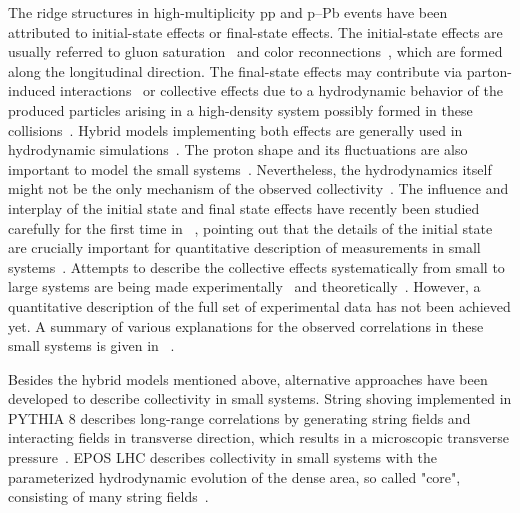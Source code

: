 The ridge structures in high-multiplicity pp and p--Pb events have been attributed to initial-state effects or final-state effects. The initial-state effects are usually referred to gluon saturation~\cite{Dusling:2012cg,Bzdak:2013zma} and color reconnections~\cite{Ortiz:2013yxa,Sarma:2019teo}, which are formed along the longitudinal direction. The final-state effects may contribute via parton-induced interactions~\cite{Arbuzov:2011yr} or collective effects due to a hydrodynamic behavior of the produced particles arising in a high-density system possibly formed in these collisions~\cite{Weller:2017tsr,Zhao:2017rgg}. 
Hybrid models implementing both effects are generally used in hydrodynamic simulations~\cite{Greif:2017bnr,Mantysaari:2017cni}. 
The proton shape and its fluctuations are also important to model the small systems~\cite{Mantysaari:2017cni}.
Nevertheless, the hydrodynamics itself might not be the only mechanism of the observed collectivity~\cite{Zhao:2020pty}. 
The influence and interplay of the initial state and final state effects have recently been studied carefully for the first time in ~\cite{Greif:2019ygb}, pointing out that the details of the initial state are crucially important for quantitative description of measurements in small systems~\cite{Schenke:2019pmk}. 
Attempts to describe the collective effects systematically from small to large systems are being made experimentally~\cite{Acharya:2019vdf} and theoretically~\cite{Greif:2019ygb}.
However, a quantitative description of the full set of experimental data has not been achieved yet.
A summary of various explanations for the observed correlations in these small systems is given in ~\cite{Strickland:2018exs,Loizides:2016tew,Nagle:2018nvi}.

Besides the hybrid models mentioned above, alternative approaches have been developed to describe collectivity in small systems. String shoving implemented in PYTHIA 8 describes long-range correlations by generating string fields and interacting fields in transverse direction, which results in a microscopic transverse pressure~\cite{Bierlich:2017vhg}. EPOS LHC describes collectivity in small systems with the parameterized hydrodynamic evolution of the dense area, so called "core", consisting of many string fields~\cite{Pierog:2013ria}.

